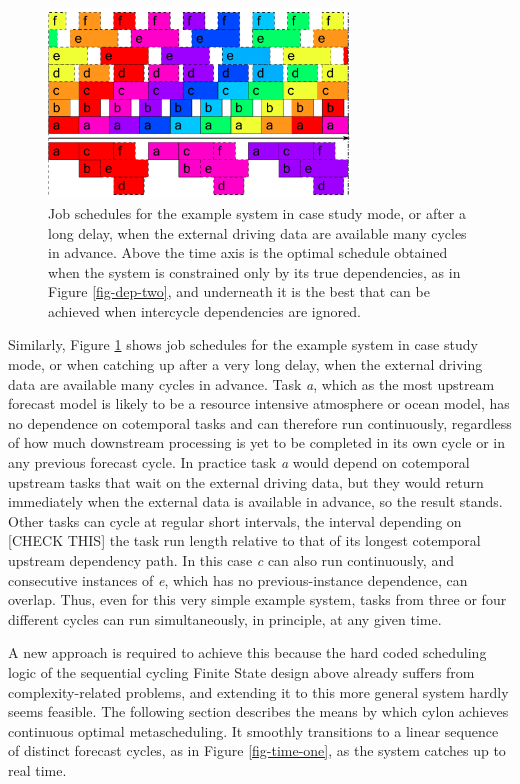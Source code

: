 \documentclass[11pt,a4paper]{article}
\begin{document}
\begin{figure} 
    \begin{center} 
        \includegraphics[width=8cm]{timeline-two}
    \end{center} 
    \caption{\small Job schedules for the example system in case study
    mode, or after a long delay, when the external driving data are
    available many cycles in advance. Above the time axis is the optimal
    schedule obtained when the system is constrained only by its true
    dependencies, as in Figure \ref{fig-dep-two}, and underneath it is
    the best that can be achieved when intercycle dependencies are
    ignored.} 
    \label{fig-time-two}
\end{figure} 

Similarly, Figure \ref{fig-time-two} shows job schedules for the example
system in case study mode, or when catching up after a very long delay,
when the external driving data are available many cycles in advance.
Task {\em a}, which as the most upstream forecast model is likely to be
a resource intensive atmosphere or ocean model, has no dependence on
cotemporal tasks and can therefore run continuously, regardless of how
much downstream processing is yet to be completed in its own cycle or in
any previous forecast cycle. In practice task {\em a} would depend on
cotemporal upstream tasks that wait on the external driving data, but
they would return immediately when the external data is available in
advance, so the result stands. Other tasks can cycle at regular short
intervals, the interval depending on [CHECK THIS] the task run length
relative to that of its longest cotemporal upstream dependency path. In
this case {\em c} can also run continuously, and consecutive instances
of {\em e}, which has no previous-instance dependence, can overlap.
Thus, even for this very simple example system, tasks from three or four
different cycles can run simultaneously, in principle, at any given
time. 

A new approach is required to achieve this because the hard coded
scheduling logic of the sequential cycling Finite State design above
already suffers from complexity-related problems, and extending it to
this more general system hardly seems feasible. The following section
describes the means by which cylon achieves continuous optimal
metascheduling. It smoothly transitions to a linear sequence of distinct
forecast cycles, as in Figure \ref{fig-time-one}, as the system catches
up to real time.  
\end{document}
